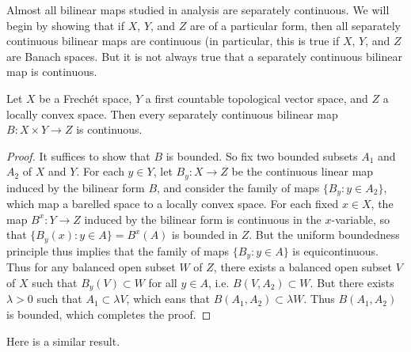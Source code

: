Almost all bilinear maps studied in analysis are separately continuous. We will begin by showing that if $X$, $Y$, and $Z$ are of a particular form, then all separately continuous bilinear maps are continuous (in particular, this is true if $X$, $Y$, and $Z$ are Banach spaces. But it is not always true that a separately continuous bilinear map is continuous.

\begin{theorem}
    Let $X$ be a Frech\'{e}t space, $Y$ a first countable topological vector space, and $Z$ a locally convex space. Then every separately continuous bilinear map $B: X \times Y \to Z$ is continuous.
\end{theorem}
\begin{proof}
    It suffices to show that $B$ is bounded. So fix two bounded subsets $A_1$ and $A_2$ of $X$ and $Y$. For each $y \in Y$, let $B_y: X \to Z$ be the continuous linear map induced by the bilinear form $B$, and consider the family of maps $\{ B_y: y \in A_2 \}$, which map a barelled space to a locally convex space. For each fixed $x \in X$, the map $B^x: Y \to Z$ induced by the bilinear form is continuous in the $x$-variable, so that $\{ B_y(x): y \in A \} = B^x(A)$ is bounded in $Z$. But the uniform boundedness principle thus implies that the family of maps $\{ B_y : y \in A \}$ is equicontinuous. Thus for any balanced open subset $W$ of $Z$, there exists a balanced open subset $V$ of $X$ such that $B_y(V) \subset W$ for all $y \in A$, i.e. $B(V,A_2) \subset W$. But there exists $\lambda > 0$ such that $A_1 \subset \lambda V$, which eans that $B(A_1,A_2) \subset \lambda W$. Thus $B(A_1,A_2)$ is bounded, which completes the proof.
\end{proof}

\begin{remark}
    
\end{remark}

Here is a similar result.

